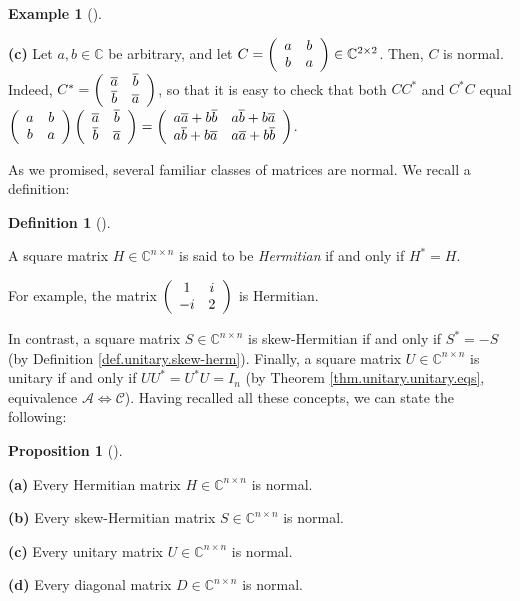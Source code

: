 \documentclass[numbers=enddot,12pt,final,onecolumn,notitlepage]{scrartcl}%
\numberwithin{exer}{subsection}
\theoremstyle{definition}
\newtheorem{prop}[theo]{Proposition}
\newenvironment{proposition}[1][]
{\begin{prop}[#1]\begin{leftbar}}
{\end{leftbar}\end{prop}}
\newtheorem{defi}[theo]{Definition}
\newenvironment{definition}[1][]
{\begin{defi}[#1]\begin{leftbar}}
{\end{leftbar}\end{defi}}
\newtheorem{exam}[theo]{Example}
\newenvironment{example}[1][]
{\begin{exam}[#1]\begin{leftbar}}
{\end{leftbar}\end{exam}}
\begin{document}
\begin{example}
\textbf{(c)} Let $a,b\in\mathbb{C}$ be arbitrary, and let $C=\left(
\begin{array}
[c]{cc}%
a & b\\
b & a
\end{array}
\right)  \in\mathbb{C}^{2\times2}$. Then, $C$ is normal. Indeed, $C^{\ast
}=\left(
\begin{array}
[c]{cc}%
\overline{a} & \overline{b}\\
\overline{b} & \overline{a}%
\end{array}
\right)  $, so that it is easy to check that both $CC^{\ast}$ and $C^{\ast}C$
equal $\left(
\begin{array}
[c]{cc}%
a & b\\
b & a
\end{array}
\right)  \left(
\begin{array}
[c]{cc}%
\overline{a} & \overline{b}\\
\overline{b} & \overline{a}%
\end{array}
\right)  =\left(
\begin{array}
[c]{cc}%
a\overline{a}+b\overline{b} & a\overline{b}+b\overline{a}\\
a\overline{b}+b\overline{a} & a\overline{a}+b\overline{b}%
\end{array}
\right)  $.
\end{example}

As we promised, several familiar classes of matrices are normal. We recall a definition:

\begin{definition}
\label{def.schurtri.herm}A square matrix $H\in\mathbb{C}^{n\times n}$ is said
to be \emph{Hermitian} if and only if $H^{\ast}=H$.
\end{definition}

For example, the matrix $\left(
\begin{array}
[c]{cc}%
1 & i\\
-i & 2
\end{array}
\right)  $ is Hermitian.

In contrast, a square matrix $S\in\mathbb{C}^{n\times n}$ is skew-Hermitian if
and only if $S^{\ast}=-S$ (by Definition \ref{def.unitary.skew-herm}).
Finally, a square matrix $U\in\mathbb{C}^{n\times n}$ is unitary if and only
if $UU^{\ast}=U^{\ast}U=I_{n}$ (by Theorem \ref{thm.unitary.unitary.eqs},
equivalence $\mathcal{A}\Longleftrightarrow\mathcal{C}$). Having recalled all
these concepts, we can state the following:

\begin{proposition}
\label{prop.schurtri.normal.classes}\textbf{(a)} Every Hermitian matrix
$H\in\mathbb{C}^{n\times n}$ is normal. \medskip

\textbf{(b)} Every skew-Hermitian matrix $S\in\mathbb{C}^{n\times n}$ is
normal. \medskip

\textbf{(c)} Every unitary matrix $U\in\mathbb{C}^{n\times n}$ is normal.
\medskip

\textbf{(d)} Every diagonal matrix $D\in\mathbb{C}^{n\times n}$ is normal.
\end{proposition}
\end{document}
